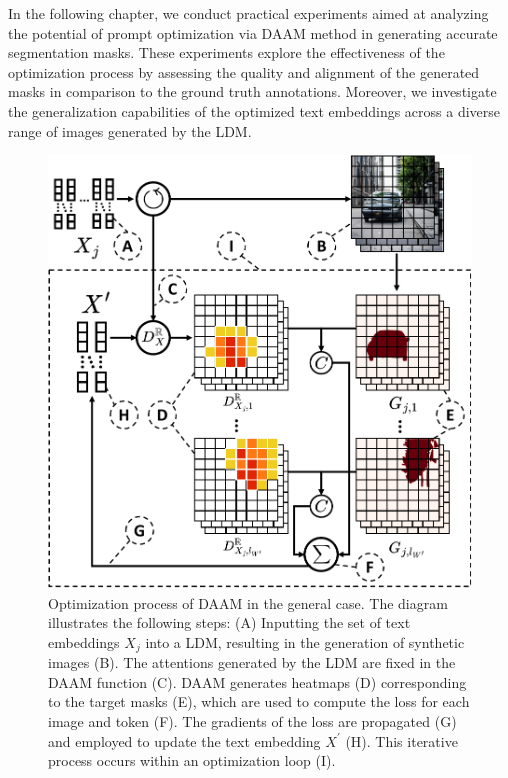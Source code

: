 In the following chapter, we conduct practical experiments aimed at analyzing the potential of prompt optimization via DAAM method in generating accurate segmentation masks. These experiments explore the effectiveness of the optimization process by assessing the quality and alignment of the generated masks in comparison to the ground truth annotations. Moreover, we investigate the generalization capabilities of the optimized text embeddings across a diverse range of images generated by the LDM.

\begin{figure}
    \centering
    \includegraphics[width=0.8\columnwidth]{img/3-methodology/general-optimization.pdf}
    \caption[Prompt Optimization Diagram. General case.]{Optimization process of DAAM in the general case. The diagram illustrates the following steps: (A) Inputting the set of text embeddings $X_j$ into a LDM, resulting in the generation of synthetic images (B). The attentions generated by the LDM are fixed in the DAAM function (C). DAAM generates heatmaps (D) corresponding to the target masks (E), which are used to compute the loss for each image and token (F). The gradients of the loss are propagated (G) and employed to update the text embedding $X^\prime$ (H). This iterative process occurs within an optimization loop (I).}
    \label{fig:daam-general-optimization-diagram}
\end{figure}
